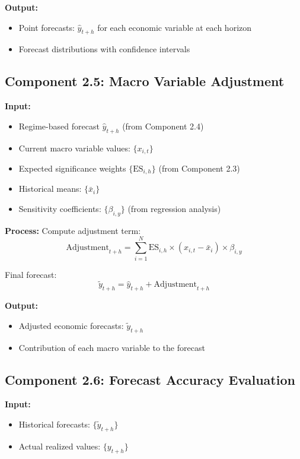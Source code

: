\documentclass[11pt,a4paper]{article}
\begin{document}
\textbf{Output:}
\begin{itemize}
    \item Point forecasts: $\hat{y}_{t+h}$ for each economic variable at each horizon
    \item Forecast distributions with confidence intervals
\end{itemize}

\subsection{Component 2.5: Macro Variable Adjustment}

\textbf{Input:}
\begin{itemize}
    \item Regime-based forecast $\hat{y}_{t+h}$ (from Component 2.4)
    \item Current macro variable values: $\{x_{i,t}\}$
    \item Expected significance weights $\{\text{ES}_{i,h}\}$ (from Component 2.3)
    \item Historical means: $\{\bar{x}_i\}$
    \item Sensitivity coefficients: $\{\beta_{i,y}\}$ (from regression analysis)
\end{itemize}

\textbf{Process:}
Compute adjustment term:
\begin{equation}
    \text{Adjustment}_{t+h} = \sum_{i=1}^{N} \text{ES}_{i,h} \times (x_{i,t} - \bar{x}_i) \times \beta_{i,y}
\end{equation}

Final forecast:
\begin{equation}
    \tilde{y}_{t+h} = \hat{y}_{t+h} + \text{Adjustment}_{t+h}
\end{equation}

\textbf{Output:}
\begin{itemize}
    \item Adjusted economic forecasts: $\tilde{y}_{t+h}$
    \item Contribution of each macro variable to the forecast
\end{itemize}

\subsection{Component 2.6: Forecast Accuracy Evaluation}

\textbf{Input:}
\begin{itemize}
    \item Historical forecasts: $\{\tilde{y}_{t+h}\}$
    \item Actual realized values: $\{y_{t+h}\}$
\end{itemize}
\end{document}
